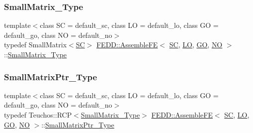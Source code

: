 \mbox{\label{classFEDD_1_1AssembleFE_a8b8c588ba0cfaa200a74215f19e62722}} 
\subsubsection{\texorpdfstring{Small\+Matrix\+\_\+\+Type}{SmallMatrix\_Type}}
{\footnotesize\ttfamily template$<$class SC  = default\+\_\+sc, class LO  = default\+\_\+lo, class GO  = default\+\_\+go, class NO  = default\+\_\+no$>$ \\
typedef Small\+Matrix$<$\hyperlink{fe__test__laplace_8cpp_a79c7e86a57edbb2a5a53242bcd04e41e}{SC}$>$ \hyperlink{classFEDD_1_1AssembleFE}{F\+E\+D\+D\+::\+Assemble\+FE}$<$ \hyperlink{fe__test__laplace_8cpp_a79c7e86a57edbb2a5a53242bcd04e41e}{SC}, \hyperlink{fe__test__laplace_8cpp_ad6a38c9f07d3fd633eefca5bccad8410}{LO}, \hyperlink{fe__test__laplace_8cpp_afa2946b509009b4f45eb04bd8c5b27d9}{GO}, \hyperlink{fe__test__laplace_8cpp_a5e24f37b28787429872b6ecb1d0417ce}{NO} $>$\+::\hyperlink{classFEDD_1_1AssembleFE_a8b8c588ba0cfaa200a74215f19e62722}{Small\+Matrix\+\_\+\+Type}}

\mbox{\label{classFEDD_1_1AssembleFE_afb5fb5dca3aab59f697a25884e99e894}} 
\subsubsection{\texorpdfstring{Small\+Matrix\+Ptr\+\_\+\+Type}{SmallMatrixPtr\_Type}}
{\footnotesize\ttfamily template$<$class SC  = default\+\_\+sc, class LO  = default\+\_\+lo, class GO  = default\+\_\+go, class NO  = default\+\_\+no$>$ \\
typedef Teuchos\+::\+R\+CP$<$\hyperlink{classFEDD_1_1AssembleFE_a8b8c588ba0cfaa200a74215f19e62722}{Small\+Matrix\+\_\+\+Type}$>$ \hyperlink{classFEDD_1_1AssembleFE}{F\+E\+D\+D\+::\+Assemble\+FE}$<$ \hyperlink{fe__test__laplace_8cpp_a79c7e86a57edbb2a5a53242bcd04e41e}{SC}, \hyperlink{fe__test__laplace_8cpp_ad6a38c9f07d3fd633eefca5bccad8410}{LO}, \hyperlink{fe__test__laplace_8cpp_afa2946b509009b4f45eb04bd8c5b27d9}{GO}, \hyperlink{fe__test__laplace_8cpp_a5e24f37b28787429872b6ecb1d0417ce}{NO} $>$\+::\hyperlink{classFEDD_1_1AssembleFE_afb5fb5dca3aab59f697a25884e99e894}{Small\+Matrix\+Ptr\+\_\+\+Type}}



